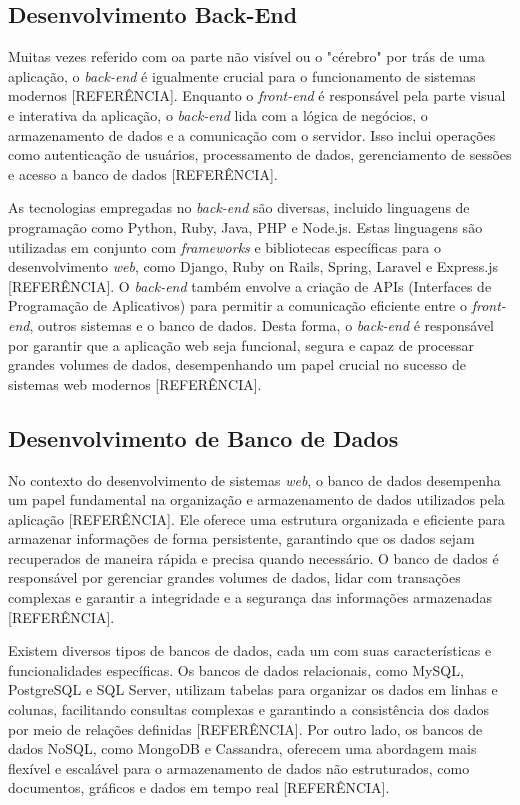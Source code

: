\subsection{Desenvolvimento Back-End}

Muitas vezes referido com oa parte não visível ou o "cérebro" por trás de uma aplicação, o \textit{back-end} é igualmente crucial para o funcionamento de sistemas modernos [REFERÊNCIA]. Enquanto o \textit{front-end} é responsável pela parte visual e interativa da aplicação, o \textit{back-end} lida com a lógica de negócios, o armazenamento de dados e a comunicação com o servidor. Isso inclui operações como autenticação de usuários, processamento de dados, gerenciamento de sessões e acesso a banco de dados [REFERÊNCIA].

As tecnologias empregadas no \textit{back-end} são diversas, incluido linguagens de programação como Python, Ruby, Java, PHP e Node.js. Estas linguagens são utilizadas em conjunto com \textit{frameworks} e bibliotecas específicas para o desenvolvimento \textit{web}, como Django, Ruby on Rails, Spring, Laravel e Express.js [REFERÊNCIA]. O \textit{back-end} também envolve a criação de APIs (Interfaces de Programação de Aplicativos) para permitir a comunicação eficiente entre o \textit{front-end}, outros sistemas e o banco de dados. Desta forma, o \textit{back-end} é responsável por garantir que a aplicação web seja funcional, segura e capaz de processar grandes volumes de dados, desempenhando um papel crucial no sucesso de sistemas web modernos [REFERÊNCIA].

\subsection{Desenvolvimento de Banco de Dados}

No contexto do desenvolvimento de sistemas \textit{web}, o banco de dados desempenha um papel fundamental na organização e armazenamento de dados utilizados pela aplicação [REFERÊNCIA]. Ele oferece uma estrutura organizada e eficiente para armazenar informações de forma persistente, garantindo que os dados sejam recuperados de maneira rápida e precisa quando necessário. O banco de dados é responsável por gerenciar grandes volumes de dados, lidar com transações complexas e garantir a integridade e a segurança das informações armazenadas [REFERÊNCIA].

Existem diversos tipos de bancos de dados, cada um com suas características e funcionalidades específicas. Os bancos de dados relacionais, como MySQL, PostgreSQL e SQL Server, utilizam tabelas para organizar os dados em linhas e colunas, facilitando consultas complexas e garantindo a consistência dos dados por meio de relações definidas [REFERÊNCIA]. Por outro lado, os bancos de dados NoSQL, como MongoDB e Cassandra, oferecem uma abordagem mais flexível e escalável para o armazenamento de dados não estruturados, como documentos, gráficos e dados em tempo real [REFERÊNCIA].

